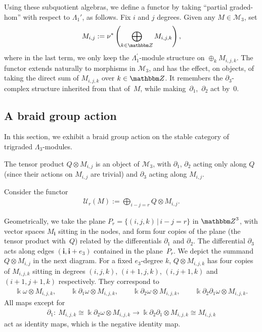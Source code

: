 \documentclass[10pt,a4paper]{amsart}
\theoremstyle{definition}
\numberwithin{equation}{section}
\def\Z{{\mathbbm Z}}
\def\dif{\partial}
\def\lra{{\longrightarrow}}
\def\mc{\mathcal}
\begin{document}
Using these subquotient algebras, we define a functor by taking ``partial graded-hom'' with respect to $\Lambda_1'$, as follows. Fix $i$ and $j$ degrees. Given any $M\in \mc{M}_3$, set
\begin{gather*}
M_{i,j}:= \nu^*\left( \bigoplus_{k\in \Z}M_{i,j,k}\right),
\end{gather*}
where in the last term, we only keep the $\Lambda_1^\prime$-module structure on $\oplus_{k} M_{i,j,k}$.
The functor extends naturally to morphisms in $\mc{M}_3$, and has the effect, on objects, of taking the direct sum of $M_{i,j,k}$ over $k\in \Z$. It remembers the $\dif_3$-complex structure inherited from that of~$M$, while making~$\partial_1$,~$\partial_2$ act by~$0$.


\subsection{A braid group action}
In this section, we exhibit a braid group action on the stable category of trigraded $\Lambda_3$-modules.

The tensor product $Q\otimes M_{i,j}$ is an object of $\mc{M}_3$, with
$\partial_1$, $\partial_2$ acting only along $Q$ (since their actions on $M_{i,j}$
are trivial) and $\partial_3$ acting along $M_{i,j}$.

Consider the functor
\begin{gather*}
\mc{U}_r(M) := \bigoplus_{i-j=r} Q\otimes M_{i,j} .
\end{gather*}

Geometrically, we take the plane $P_r=\{(i,j,k)\,|\, i-j=r\}$ in $\Z^3$,
with vector spaces $M_{\mathbf{i}}$ sitting in the nodes, and form four copies
of the plane (the tensor product with~$Q$) related by the differentials $\partial_1 $
and $\partial_2$. The differential $\partial_3$ acts along edges $(\mathbf{i},\mathbf{i}+e_3)$
contained in the plane~$P_r$. We depict the summand $Q\otimes M_{i,j}$ in the next diagram. For a fixed $e_3$-degree $k$, $Q\otimes M_{i,j,k}$ has four copies of $M_{i,j,k}$ sitting in degrees $(i,j,k)$, $(i+1,j,k)$, $(i,j+1,k)$ and $(i+1,j+1,k)$ respectively. They correspond to
\begin{gather*}
\Bbbk\omega\otimes M_{i,j,k},\qquad
\Bbbk\dif_1\omega\otimes M_{i,j,k},\qquad
\Bbbk\dif_2\omega\otimes M_{i,j,k}, \qquad
\Bbbk \dif_2\dif_1\omega \otimes M_{i,j,k}.
\end{gather*}
All maps except for{\samepage
\begin{gather*}\dif_1\colon \ M_{i,j,k}\cong \Bbbk\dif_2\omega \otimes M_{i,j,k}\lra \Bbbk \dif_2\dif_1\otimes M_{i,j,k} \cong M_{i,j,k}\end{gather*}
act as identity maps, which is the negative identity map.}
\end{document}
